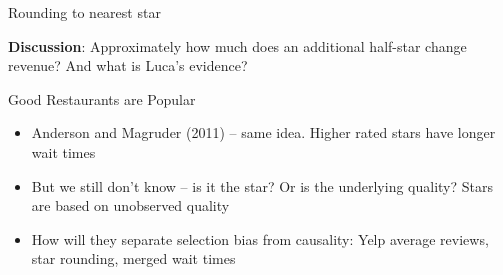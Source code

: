 \documentclass{beamer}
\begin{document}
\begin{frame}{Rounding to nearest star}
	
	\begin{figure}
	\end{figure}

\bigskip

\textbf{Discussion}: Approximately how much does an additional half-star change revenue? And what is Luca's evidence?
	
\end{frame}


\begin{frame}{Good Restaurants are Popular}

\begin{itemize}
\item Anderson and Magruder (2011) -- same idea. Higher rated stars have longer wait times
\item But we still don't know -- is it the star?  Or is the underlying quality?  Stars are based on unobserved quality
\item How will they separate selection bias from causality: Yelp average reviews, star rounding, merged wait times
\end{itemize}

\end{frame}
\end{document}
